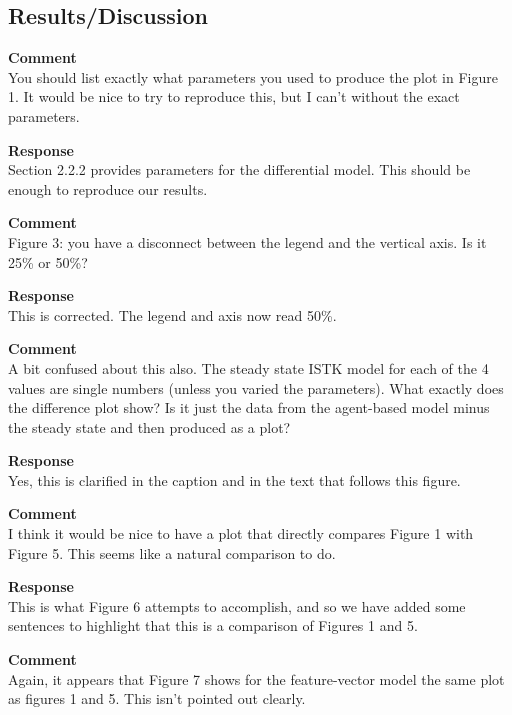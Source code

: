 \subsection{Results/Discussion}
\setcounter{rev2-results-discussion}{1}

\textbf{Comment } \\
You should list exactly what parameters you used to produce the plot in Figure 1.
It would be nice to try to reproduce this, but I can't without the exact parameters.

\textbf{Response } \\
Section 2.2.2 provides parameters for the differential model.
This should be enough to reproduce our results.

\textbf{Comment } \\
Figure 3: you have a disconnect between the legend and the vertical axis.
Is it 25\% or 50\%?

\textbf{Response } \\
This is corrected. The legend and axis now read 50\%.

\textbf{Comment } \\
A bit confused about this also.
The steady state ISTK model for each of the 4 values are single numbers (unless you varied the parameters).
What exactly does the difference plot show?
Is it just the data from the agent-based model minus the steady state and then produced as a plot?

\textbf{Response } \\
Yes, this is clarified in the caption and in the text that follows this figure.

\textbf{Comment } \\
I think it would be nice to have a plot that directly compares Figure 1 with Figure 5.
This seems like a natural comparison to do.

\textbf{Response } \\
This is what Figure 6 attempts to accomplish, and so we have added some sentences to highlight that this is a comparison of Figures 1 and 5.

\textbf{Comment } \\
Again, it appears that Figure 7 shows for the feature-vector model the same plot as figures 1 and 5. This isn't pointed out clearly.

